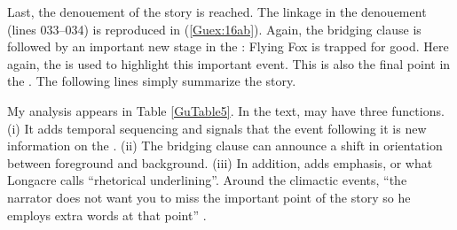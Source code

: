 \documentclass[output=paper]{LSP/langsci}
\begin{document}
Last, the denouement of the story is reached. The linkage in the denouement (lines 033--034) is reproduced in (\ref{Guex:16ab}). Again, the bridging clause is followed by an important new stage in the : Flying Fox is trapped for good. Here again, the   is used to highlight this important event. This is also the final point in the . The following lines simply summarize the story. 

My analysis appears in Table \ref{GuTable5}. In the  text,  may have three functions. (i) It adds temporal sequencing and signals that the event following it is new information on the . (ii) The bridging clause can announce a shift in orientation between foreground and background.  (iii) In addition,  adds emphasis, or what Longacre calls ``rhetorical underlining''. Around the climactic events, ``the narrator does not want you to miss the important point of the story so he employs extra words at that point'' \citep[][26]{longacre83}. 
\end{document}
